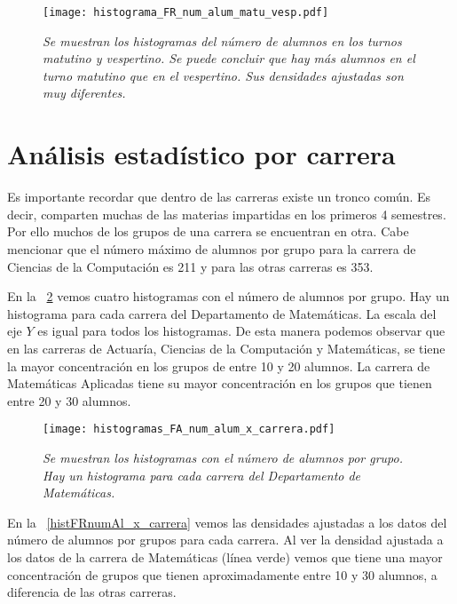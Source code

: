 \begin{figure}[H]
\centering
\texttt{[image: histograma\_FR\_num\_alum\_matu\_vesp.pdf]} %
\caption[\textit{Histogramas del número de alumnos en los turnos matutino y vespertino}]{\textit{Se muestran los histogramas del número de alumnos en los turnos matutino y vespertino. Se puede concluir que hay más alumnos en el turno matutino que en el vespertino. Sus densidades ajustadas son muy diferentes.}}\label{histNumAlTotal_MatuVesp}
\end{figure}


\section{Análisis estadístico por carrera}

Es importante recordar que dentro de las carreras existe un tronco común. Es decir, comparten muchas de las materias impartidas en los primeros 4 semestres. Por ello muchos de los grupos de una carrera se encuentran en otra. Cabe mencionar que el número máximo de alumnos por grupo para la carrera de Ciencias de la Computación es 211 y para las otras carreras es 353.

En la \figurename{~\ref{histFAnumAl_x_carrera}} vemos cuatro histogramas con el número de alumnos por grupo. Hay un histograma para cada carrera del Departamento de Matemáticas. La escala del eje $Y$ es igual para todos los histogramas. De esta manera podemos observar que en las carreras de Actuaría, Ciencias de la Computación y Matemáticas, se tiene la mayor concentración en los grupos de entre 10 y 20 alumnos. La carrera de Matemáticas Aplicadas tiene su mayor concentración en los grupos que tienen entre 20 y 30 alumnos.

\begin{figure}[H]
\centering
\texttt{[image: histogramas\_FA\_num\_alum\_x\_carrera.pdf]} %
\caption[\textit{Histogramas del número de alumnos por carrera}]{\textit{Se muestran los histogramas con el número de alumnos por grupo. Hay un histograma para cada carrera del Departamento de Matemáticas.}}\label{histFAnumAl_x_carrera}
\end{figure}


En la \figurename{~\ref{histFRnumAl_x_carrera}} vemos las densidades ajustadas a los datos del número de alumnos por grupos para cada carrera. Al ver la densidad ajustada a los datos de la carrera de Matemáticas (línea verde) vemos que tiene una mayor concentración de grupos que tienen aproximadamente entre 10 y 30 alumnos, a diferencia de las otras carreras.

